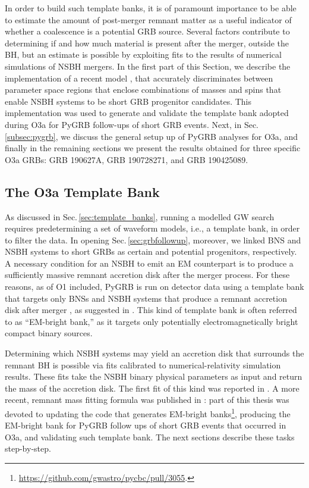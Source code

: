 \documentclass[binding=0.6cm, LaM]{sapthesis}
\begin{document}
        In order to build such template banks,
        it is of paramount importance to be able to estimate the amount of post-merger remnant matter as a useful indicator of
        whether a coalescence is a potential GRB source.
        Several factors contribute to determining if and how much material is present after the merger, outside the BH,
        but an estimate is possible by exploiting fits to the results of
        numerical simulations of NSBH mergers.
        In the first part of this Section, we describe the implementation of a recent model \cite{54}, that accurately discriminates between parameter space
        regions that enclose combinations of masses and spins that enable NSBH systems to be short GRB progenitor candidates.
        This implementation was used to generate and validate the template bank adopted during O3a for {\ttfamily PyGRB} follow-ups of short GRB events.
        Next, in Sec.\,\ref{subsec:pygrb}, we discuss the general setup up of {\ttfamily PyGRB} analyses for O3a, and finally in the remaining sections we present the results obtained for three specific O3a GRBs: GRB 190627A, GRB 190728271, and GRB 190425089.

\subsection{The O3a Template Bank}
\label{subsec:o3aTemplateBank}
	As discussed in Sec.\,\ref{sec:template_banks}, running a modelled GW search 
	requires predetermining a set of waveform models, i.e., a template bank, in order to filter the data. 
	In opening Sec.\,\ref{sec:grbfollowup}, moreover, we linked BNS and NSBH systems to short GRBs as certain and potential progenitors, respectively.
	A necessary condition for an NSBH to emit an EM counterpart
	is to produce a sufficiently massive remnant accretion disk after the merger process.
	For these reasons, as of O1 included, {\ttfamily PyGRB} is run on detector data using a template bank
	that targets only BNSs and NSBH systems that produce a remnant accretion disk after merger \cite{55,136,161}, as suggested in \cite{162}.  This kind of template bank is often referred to as ``EM-bright bank,'' as it targets only potentially electromagnetically bright compact binary sources.

        Determining which NSBH systems may yield an accretion disk that surrounds the remnant BH is possible via fits calibrated to numerical-relativity simulation results.  These fits take the NSBH binary physical parameters as input and return the mass of the accretion disk.
        The first fit of this kind was reported in \cite{50}.
	A more recent, remnant mass fitting formula was published in \cite{54}:
        part of this thesis was devoted to updating the code that generates EM-bright banks\footnote{\url{https://github.com/gwastro/pycbc/pull/3055}.}, producing the EM-bright bank for {\ttfamily PyGRB} follow ups of short GRB events that occurred in O3a, and validating such template bank.
	The next sections describe these tasks step-by-step.
\end{document}
